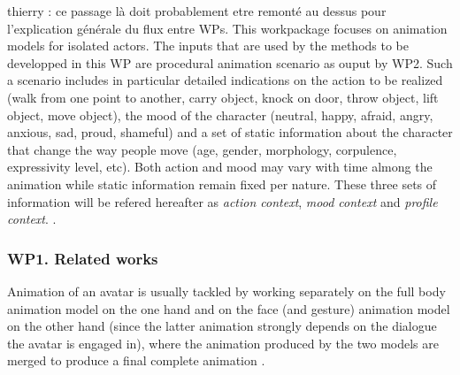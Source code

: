 
thierry : ce passage là doit probablement etre remonté au dessus pour l'explication générale du flux entre WPs. This workpackage focuses on animation models for isolated actors. 
The inputs that are used by the methods to be developped in this WP are procedural animation scenario as ouput by WP2. 
Such a scenario includes in particular detailed indications on the action to be realized (walk from one point to another, carry object, knock on door, throw object, lift object, move object), the mood of the character (neutral, happy, afraid, angry, anxious, sad, proud, shameful) and a set of static information about the character that change the way people move (age, gender, morphology, corpulence, expressivity level, etc). Both action and mood may vary with time almong the animation while static information remain fixed per nature. 
These three sets of information will be refered hereafter as \textit{action context}, \textit{mood context} and \textit{profile context}. . 

\subsubsection{WP1. Related works}

Animation of an avatar is usually tackled by working separately on the full body animation model on the one hand and on the face (and gesture) animation model on the other hand (since the latter animation strongly depends on the dialogue the avatar is engaged in), where the animation produced by the two models are merged to produce a final complete animation \cite{DBLP:journals/tvcg/ShoulsonMKB14}. 

